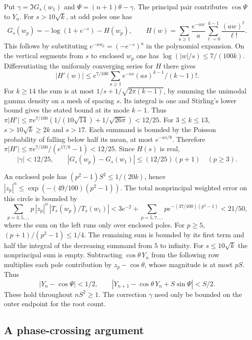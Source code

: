 Put $\gamma=\Im G_s(w_1)$ and $\Psi=(n+1)\theta-\gamma$. The principal pair contributes $\cos\Psi$ to $Y_n$. For $s>10\sqrt k$, at odd poles one has
\[
G_s(w_p)=-\log(1+e^{-s})-H(w_p),\qquad
H(w)=\sum_{a\ge1}\frac{e^{-aw}}a\sum_{\ell=0}^{k-1}\frac{(aw)^\ell}{\ell!}.
\]
This follows by substituting $e^{-aw_p}=(-e^{-s})^a$ in the polynomial expansion. On the vertical segments from $s$ to enclosed $w_p$ one has $\log(|w|/s)\le 7/(100k)$. Differentiating the uniformly converging series for $H$ there gives
\[
|H'(w)|\le e^{7/100}\sum_{a\ge1}e^{-as}(as)^{k-1}/(k-1)!.
\]
For $k\ge14$ the sum is at most $1/s+1/\sqrt{2\pi(k-1)}$, by summing the unimodal gamma density on a mesh of spacing $s$. Its integral is one and Stirling's lower bound gives the stated bound at its mode $k-1$. Thus $\pi |H'|\le\pi e^{7/100}(1/(10\sqrt{14})+1/\sqrt{26\pi})<12/25$. For $3\le k\le13$, $s>10\sqrt k\ge2k$ and $s>17$. Each summand is bounded by the Poisson probability of falling below half its mean, at most $e^{-as/8}$. Therefore $\pi |H'|\le\pi e^{7/100}/(e^{17/8}-1)<12/25$. Since $H(s)$ is real,
\[
|\gamma|<12/25,\qquad
|G_s(w_p)-G_s(w_1)|\le(12/25)(p+1) \quad(p\ge3).
\]

An enclosed pole has $(p^2-1)S^2\le1/(20k)$, hence $|z_p|^n\le\exp(-(49/100)(p^2-1))$. The total nonprincipal weighted error on this circle is bounded by
\[
\sum_{p=3,5,\ldots}p\,|z_p|^n\,|T_s(w_p)/T_s(w_1)|
<3e^{-2}+\sum_{p=5,7,\ldots}p e^{-(37/100)(p^2-1)}<21/50 ,
\]
where the sum on the left runs only over enclosed poles. For $p\ge5$, $(p+1)/(p^2-1)\le1/4$. The remaining sum is bounded by its first term and half the integral of the decreasing summand from $5$ to infinity. For $s\le10\sqrt k$ the nonprincipal sum is empty. Subtracting $\cos\theta\,Y_n$ from the following row multiplies each pole contribution by $z_p-\cos\theta$, whose magnitude is at most $pS$. Thus
\[
|Y_n-\cos\Psi|<1/2,\qquad |Y_{n+1}-\cos\theta\,Y_n+S\sin\Psi|< S/2. \tag{U3}
\]
These hold throughout $nS^2\ge1$. The correction $\gamma$ need only be bounded on the outer endpoint for the root count.

\subsection{A phase-crossing argument}

